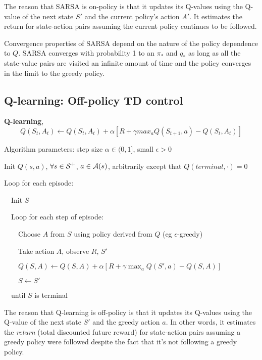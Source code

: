 \documentclass[sutton_barto_notes.tex]{subfiles}
\begin{document}
The reason that SARSA is on-policy is that it updates its Q-values using the Q-value of the next state $S'$ and the current policy's action $A'$. It estimates the return for state-action pairs assuming the current policy continues to be followed.

Convergence properties of SARSA depend on the nature of the policy dependence to $Q$. SARSA converges with probability 1 to an $\pi_*$ and $q_*$ as long as all the state-value pairs are visited an infinite amount of time and the policy converges in the limit to the greedy policy.

\subsection{Q-learning: Off-policy TD control}

\begin{definition}
\textbf{Q-learning},
$$Q(S_t,A_t)\leftarrow Q(S_t, A_t)+\alpha [R + \gamma max_a Q(S_{t+1}, a) - Q(S_t, A_t)]$$
\end{definition}

\begin{tcolorbox}[width=1.1\textwidth,title={Q-learning (off-policy TD control) for estimating $\pi\approx \pi_*$}]
Algorithm parameters: step size $\alpha \in (0,1]$, small $\epsilon > 0$

Init $Q(s,a)$, $\forall s \in {\operatorname*{\mathcal{S}}}^+$, $a \in \operatorname*{\mathcal{A}}(s)$, arbitrarily except that $Q(terminal,\cdot)=0$

Loop for each episode:

$\quad$Init $S$

$\quad$Loop for each step of episode:

$\quad\quad$Choose $A$ from $S$ using policy derived from $Q$ (eg $\epsilon$-greedy)

$\quad\quad$Take action $A$, observe $R$, $S'$

$\quad\quad Q(S, A) \leftarrow Q(S, A) + \alpha [ R + \gamma \max_a Q( S', a) - Q(S, A)]$

$\quad\quad S \leftarrow S'$

$\quad$until $S$ is terminal
\end{tcolorbox}

The reason that Q-learning is off-policy is that it updates its Q-values using the Q-value of the next state $S'$ and the greedy action $a$. In other words, it estimates the \textit{return} (total discounted future reward) for state-action pairs assuming a greedy policy were followed despite the fact that it's not following a greedy policy.
\end{document}
